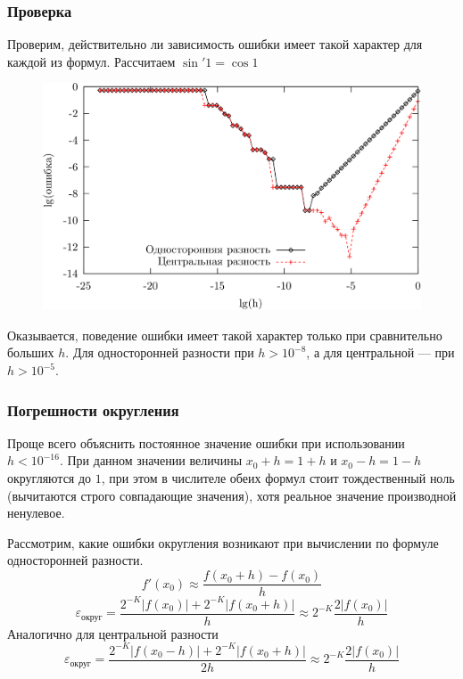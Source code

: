 \documentclass[aspectratio=43,unicode]{beamer}
\begin{document}
\begin{frame}
\frametitle{Проверка}
	Проверим, действительно ли зависимость ошибки имеет такой характер для каждой из формул. Рассчитаем $\sin'1 = \cos 1$

	\begin{figure}%
	\centering
	\includegraphics[height=0.5\textheight]{diff.png}%
	\end{figure}

	Оказывается, поведение ошибки имеет такой характер только при сравнительно больших $h$. Для односторонней разности при $h > 10^{-8}$,
	а для центральной --- при $h > 10^{-5}$.
\end{frame}

\begin{frame}
\frametitle{Погрешности округления}
	Проще всего объяснить постоянное значение ошибки при использовании $h < 10^{-16}$. При данном значении величины
	$x_0+h = 1+h$ и $x_0-h = 1-h$ округляются до $1$, при этом в числителе обеих формул стоит тождественный ноль
	(вычитаются строго совпадающие значения), хотя реальное значение производной ненулевое.
	\pause

	Рассмотрим, какие ошибки округления возникают при вычислении по формуле односторонней разности.
	\[
	f'(x_0) \approx \frac{f(x_0+h)-f(x_0)}{h}
	\]
	\[
	\varepsilon_{\text{округ}} = \frac{2^{-K}|f(x_0)|+2^{-K}|f(x_0+h)|}{h} \approx 2^{-K} \frac{2|f(x_0)|}{h}
	\]
	Аналогично для центральной разности
	\[
	\varepsilon_{\text{округ}} = \frac{2^{-K}|f(x_0-h)|+2^{-K}|f(x_0+h)|}{2h}
	\approx 2^{-K} \frac{2|f(x_0)|}{h}
	\]
\end{frame}
\end{document}
